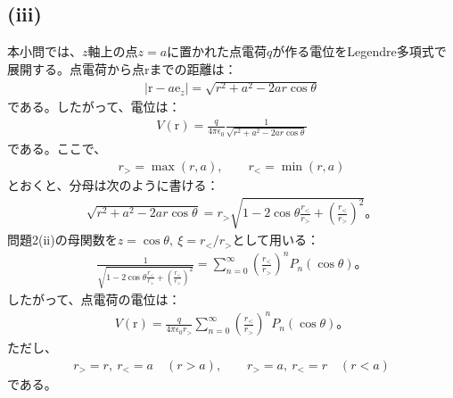 \documentclass[platex,dvipdfmx,a4paper]{jsarticle}
\newcommand{\vect}[1]{\boldsymbol{\mathrm{#1}}}
\newcommand{\ssum}[3]{\sum_{#1=#2}^#3}
\begin{document}
  \subsection*{(iii)}
  本小問では、$z$軸上の点$z=a$に置かれた点電荷$q$が作る電位をLegendre多項式で展開する。点電荷から点$\vect{r}$までの距離は：
  \begin{align*}
    |\vect{r}-a\vect{e}_z|=\sqrt{r^2+a^2-2ar\cos\theta}
  \end{align*}
  である。したがって、電位は：
  \begin{align*}
    V(\vect{r})=\frac{q}{4\pi\epsilon_0}\frac{1}{\sqrt{r^2+a^2-2ar\cos\theta}}
  \end{align*}
  である。ここで、
  \begin{align*}
    r_>=\max(r,a),\qquad r_<=\min(r,a)
  \end{align*}
  とおくと、分母は次のように書ける：
  \begin{align*}
    \sqrt{r^2+a^2-2ar\cos\theta}=r_>\sqrt{1-2\cos\theta\frac{r_<}{r_>}+\left(\frac{r_<}{r_>}\right)^2}。
  \end{align*}
  問題2(ii)の母関数を$z=\cos\theta,\ \xi=r_</r_>$として用いる：
  \begin{align*}
    \frac{1}{\sqrt{1-2\cos\theta\frac{r_<}{r_>}+\left(\frac{r_<}{r_>}\right)^2}}=\ssum{n}{0}{\infty}\left(\frac{r_<}{r_>}\right)^nP_n(\cos\theta)。
  \end{align*}
  したがって、点電荷の電位は：
  \begin{align*}
    V(\vect{r})=\frac{q}{4\pi\epsilon_0 r_>}\ssum{n}{0}{\infty}\left(\frac{r_<}{r_>}\right)^nP_n(\cos\theta)。
  \end{align*}
  ただし、
  \begin{align*}
    r_>=r,\ r_<=a\quad(r>a),\qquad r_>=a,\ r_<=r\quad(r<a)
  \end{align*}
  である。
  
\end{document}
